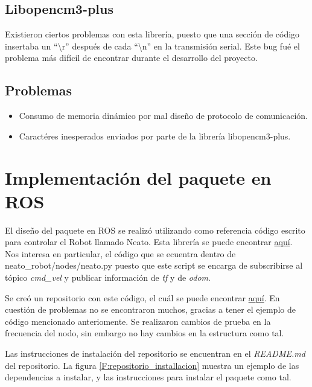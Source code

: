 \subsection{Libopencm3-plus}

Existieron ciertos problemas con esta librería, puesto que una sección de código insertaba un ``\textbackslash r'' después de cada ``\textbackslash n'' en la transmisión serial. Este bug fué el problema más difícil de encontrar durante el desarrollo del proyecto.

\subsection{Problemas}

\begin{itemize}
\item Consumo de memoria dinámico por mal diseño de protocolo de comunicación.
\item Caractéres inesperados enviados por parte de la librería libopencm3-plus.
\end{itemize}

\section{Implementación del paquete en ROS}

El diseño del paquete en ROS se realizó utilizando como referencia código escrito para controlar el Robot llamado Neato. Esta librería se puede encontrar \href{https://github.com/mikeferguson/neato_robot}{aquí}. Nos interesa en particular, el código que se ecuentra dentro de neato\_robot/nodes/neato.py puesto que este script se encarga de subscribirse al tópico \textit{cmd\_vel} y publicar información de \textit{tf} y de \textit{odom}.

Se creó un repositorio con este código, el cuál se puede encontrar \href{https://github.com/slealq/omnidirectional_robot}{aquí}. En cuestión de problemas no se encontraron muchos, gracias a tener el ejemplo de código mencionado anteriomente. Se realizaron cambios de prueba en la frecuencia del nodo, sin embargo no hay cambios en la estructura como tal.

Las instrucciones de instalación del repositorio se encuentran en el \textit{README.md} del repositorio. La figura \ref{F:repositorio_installacion} muestra un ejemplo de las dependencias a instalar, y las instrucciones para instalar el paquete como tal.

